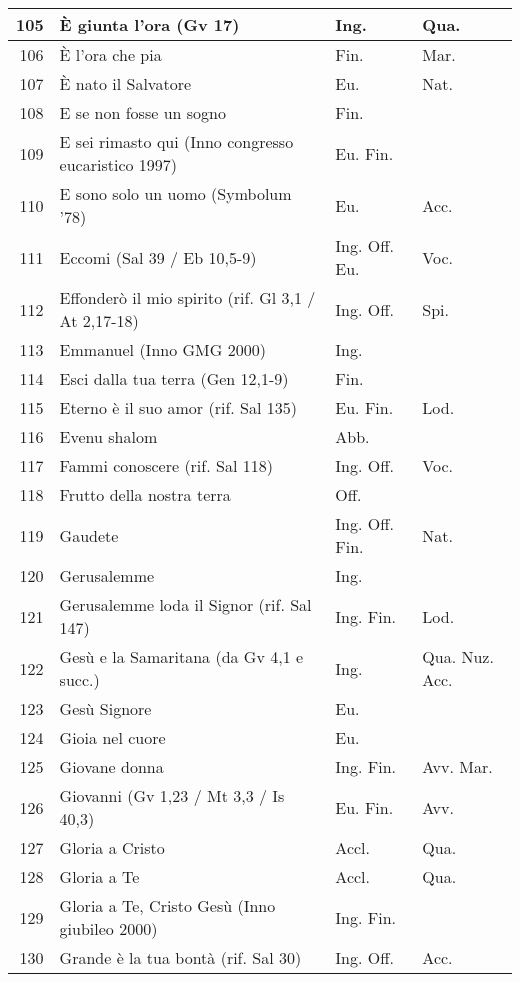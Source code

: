 {\begin{center}
\begin{longtable}{ | r | m{4.7cm} | m{1.8cm} | m{2cm}  |}
    105 & È giunta l'ora (Gv 17) & Ing. & Qua.\\ \hline
    106 & È l'ora che pia & Fin. & Mar.\\ \hline
    107 & È nato il Salvatore & Eu. & Nat.\\ \hline
    108 & E se non fosse un sogno & Fin. & \\ \hline
    109 & E sei rimasto qui (Inno congresso eucaristico 1997) & Eu. Fin. & \\ \hline
    110 & E sono solo un uomo (Symbolum '78) & Eu. & Acc.\\ \hline
    111 & Eccomi (Sal 39 / Eb 10,5-9) & Ing. Off. Eu. & Voc.\\ \hline
    112 & Effonderò il mio spirito (rif. Gl 3,1 / At 2,17-18) & Ing. Off. & Spi.\\ \hline
    113 & Emmanuel (Inno GMG 2000) & Ing. & \\ \hline
    114 & Esci dalla tua terra (Gen 12,1-9) & Fin. & \\ \hline
    115 & Eterno è il suo amor (rif. Sal 135) & Eu. Fin. & Lod.\\ \hline
    116 & Evenu shalom & Abb. & \\ \hline
    117 & Fammi conoscere (rif. Sal 118) & Ing. Off. & Voc.\\ \hline
    118 & Frutto della nostra terra & Off. & \\ \hline
    119 & Gaudete & Ing. Off. Fin. & Nat.\\ \hline
    120 & Gerusalemme & Ing. & \\ \hline
    121 & Gerusalemme loda il Signor (rif. Sal 147) & Ing. Fin. & Lod.\\ \hline
    122 & Gesù e la Samaritana (da Gv 4,1 e succ.) & Ing. & Qua. Nuz. Acc.\\ \hline
    123 & Gesù Signore & Eu. & \\ \hline
    124 & Gioia nel cuore & Eu. & \\ \hline
    125 & Giovane donna & Ing. Fin. & Avv. Mar.\\ \hline
    126 & Giovanni (Gv 1,23 / Mt 3,3 / Is 40,3) & Eu. Fin. & Avv.\\ \hline
    127 & Gloria a Cristo & Accl. & Qua.\\ \hline
    128 & Gloria a Te & Accl. & Qua.\\ \hline
    129 & Gloria a Te, Cristo Gesù (Inno giubileo 2000) & Ing. Fin. & \\ \hline
    130 & Grande è la tua bontà (rif. Sal 30) & Ing. Off. & Acc.\\ \hline

\end{longtable}
\end{center}}
